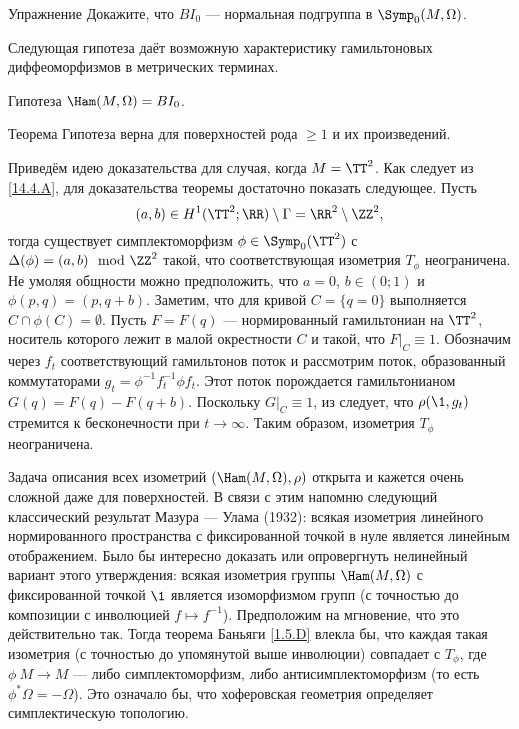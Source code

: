 \begin{ex}{Упражнение}\label{14.4.A}
Докажите, что $BI_0$ — нормальная подгруппа в $\Symp_0(M,\Omega)$.
\end{ex}

Следующая гипотеза даёт возможную характеристику гамильтоновых
диффеоморфизмов в метрических терминах. 

\begin{ex*}{Гипотеза}
$\Ham(M,\Omega) = BI_0$.
\end{ex*}

\begin{thm}[(\cite{LP})]{Теорема}\label{14.4.B}
Гипотеза верна для поверхностей рода $\ge1$ и их произведений.
\end{thm}

Приведём идею доказательства для случая, когда $M=\TT^2$.
Как следует из \ref{14.4.A}, для доказательства теоремы достаточно
показать следующее.
Пусть
\[(a,b)\in H^1(\TT^2;\RR)\setminus\Gamma=\RR^2\setminus\ZZ^2,\]
тогда существует симплектоморфизм $\phi\in\Symp_0(\TT^2)$ с $\Delta
(\phi) = (a, b) \mod \ZZ^2$ такой, что соответствующая изометрия
$T_\phi$ неограничена. 
Не умоляя общности можно предположить, что $a= 0$, $b \in (0; 1)$ и $\phi(p, q) = (p, q + b)$.
Заметим, что для кривой $C = \{q = 0\}$ выполняется $C \cap \phi(C) = \emptyset$.
Пусть $F = F(q)$ — нормированный гамильтониан на $\TT^2$, носитель которого лежит в малой окрестности $C$ и такой, что $F|_C \equiv 1$.
Обозначим через $f_t$ соответствующий гамильтонов поток и рассмотрим поток, образованный коммутаторами $g_t = \phi^{-1}f_t^{-1}\phi f_t$.
Этот поток порождается гамильтонианом $G(q) = F(q) - F(q + b)$.
Поскольку $G|_C \equiv 1$, из  следует, что $\rho(\1, g_t)$
стремится к бесконечности при $t \to \infty$. 
Таким образом, изометрия $T_\phi$ неограничена.

Задача описания всех изометрий $(\Ham(M,\Omega), \rho)$ открыта и
кажется очень сложной даже для поверхностей. 
В связи с этим напомню следующий классический результат Мазура — Улама \cite{MU} (1932): всякая
изометрия линейного нормированного пространства с фиксированной точкой
в нуле является линейным отображением. 
Было бы интересно доказать или опровергнуть нелинейный вариант этого
утверждения: всякая изометрия группы $\Ham(M,\Omega)$ с фиксированной
точкой $\1$ является изоморфизмом групп (с точностью до композиции с
инволюцией $f\mapsto f^{-1}$). 
Предположим на мгновение, что это действительно так.
Тогда теорема Баньяги \ref{1.5.D} влекла бы, что
каждая такая изометрия (с точностью до упомянутой выше инволюции)
совпадает с $T_\phi$, где $\phi\: M \to M$ — либо симплектоморфизм,
либо антисимплектоморфизм (то есть $\phi^\ast\Omega = -\Omega$).
Это означало бы, что хоферовская геометрия определяет симплектическую топологию.
